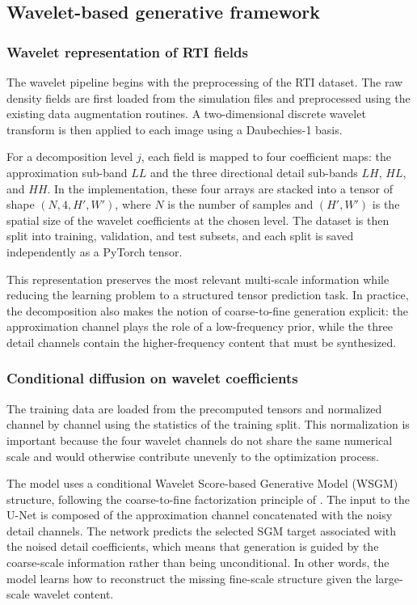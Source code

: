 \subsection{Wavelet-based generative framework}

\subsubsection{Wavelet representation of RTI fields}

The wavelet pipeline begins with the preprocessing of the RTI dataset. The raw
density fields are first loaded from the simulation files and preprocessed
using the existing data augmentation routines. A two-dimensional discrete
wavelet transform is then applied to each image using a Daubechies-1 basis.

For a decomposition level $j$, each field is mapped to four coefficient maps:
the approximation sub-band $LL$ and the three directional detail sub-bands
$LH$, $HL$, and $HH$. In the implementation,
these four arrays are stacked into a tensor of shape $(N,4,H',W')$, where $N$
is the number of samples and $(H',W')$ is the spatial size of the wavelet
coefficients at the chosen level. The dataset is then split into training,
validation, and test subsets, and each split is saved independently as a PyTorch
tensor.

This representation preserves the most relevant multi-scale information while
reducing the learning problem to a structured tensor prediction task. In
practice, the decomposition also makes the notion of coarse-to-fine generation
explicit: the approximation channel plays the role of a low-frequency prior,
while the three detail channels contain the higher-frequency content that must
be synthesized.

\subsubsection{Conditional diffusion on wavelet coefficients}

The training data are loaded from the precomputed tensors and normalized
channel by channel using the statistics of the training split. This
normalization is important because the four wavelet channels do not share the
same numerical scale and would otherwise contribute unevenly to the
optimization process.

The model uses a conditional Wavelet Score-based Generative Model (WSGM)
structure, following the coarse-to-fine factorization principle of
\citet{Guth2022WSGM}. The input to the U-Net is composed of the approximation
channel concatenated with the noisy detail channels. The network predicts the
selected SGM target associated with the noised detail coefficients, which means
that generation is guided by the coarse-scale information rather than being
unconditional. In other words, the model learns how to reconstruct the missing
fine-scale structure given the large-scale wavelet content.

